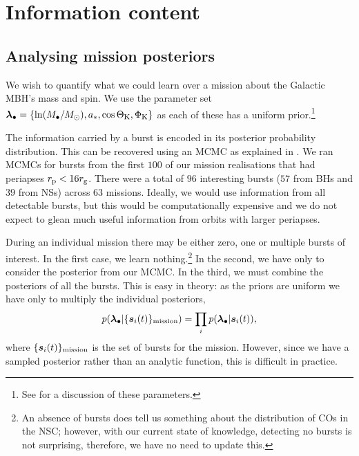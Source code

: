 \section{Information content}

\subsection{Analysing mission posteriors}

We wish to quantify what we could learn over a mission about the Galactic MBH's mass and spin. We use the parameter set $\boldsymbol{\lambda}_\bullet = \{\ln (M_\bullet/M_\odot), a_\ast, \cos \Theta_\mathrm{K}, \Phi_\mathrm{K}\}$ as each of these has a uniform prior.\footnote{See  for a discussion of these parameters.}

The information carried by a burst is encoded in its posterior probability distribution. This can be recovered using an MCMC as explained in . We ran MCMCs for bursts from the first $100$ of our mission realisations that had periapses $r_\mathrm{p} < 16 r_\mathrm{g}$. There were a total of $96$ interesting bursts ($57$ from BHs and $39$ from NSs) across $63$ missions. %
Ideally, we would use information from all detectable bursts, but this would be computationally expensive and we do not expect to glean much useful information from orbits with larger periapses.

During an individual mission there may be either zero, one or multiple bursts of interest. In the first case, we learn nothing.\footnote{An absence of bursts does tell us something about the distribution of COs in the NSC; however, with our current state of knowledge, detecting no bursts is not surprising, therefore, we have no need to update this.} In the second, we have only to consider the posterior from our MCMC. In the third, we must combine the posteriors of all the bursts. This is easy in theory: as the priors are uniform we have only to multiply the individual posteriors,
\begin{equation}
p(\boldsymbol{\lambda}_\bullet|\{\boldsymbol{s}_i(t)\}_\mathrm{mission}) = \prod_i p(\boldsymbol{\lambda}_\bullet|\boldsymbol{s}_i(t)),
\end{equation}
where $\{\boldsymbol{s}_i(t)\}_\mathrm{mission}$ is the set of bursts for the mission. However, since we have a sampled posterior rather than an analytic function, this is difficult in practice.

